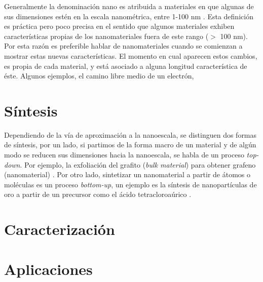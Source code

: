 
Generalmente la denominación nano es atribuida a materiales en que algunas de sus dimensiones estén en la escala nanométrica, entre 1-100 nm \citep{Gressler2013}. Esta definición es práctica pero poco precisa en el sentido que algunos materiales exhiben características propias de los nanomateriales fuera de este rango ($>$ 100 nm). Por esta razón es preferible hablar de nanomateriales cuando se comienzan a mostrar estas nuevas características. El momento en cual aparecen estos cambios, es propia de cada material, y está asociado a alguna longitud característica de éste. Algunos ejemplos, el camino libre medio de un electrón,

\section{Síntesis}
Dependiendo de la vía de aproximación a la nanoescala, se distinguen dos formas de síntesis, por un lado, si partimos de la forma macro de un material y de algún modo se reducen sus dimensiones hacia la nanoescala, se habla de un proceso \textit{top-down}. Por ejemplo, la exfoliación del grafito (\textit{bulk material}) para obtener grafeno (nanomaterial) \citep{Novoselov2004}.  Por otro lado, sintetizar un nanomaterial a partir de átomos o moléculas es un proceso \textit{bottom-up}, un ejemplo es la síntesis de nanopartículas de oro a partir de un precursor como el ácido tetracloroaúrico \citep{Daniel2004}.

\section{Caracterización}


\section{Aplicaciones}

